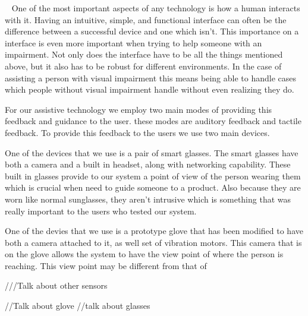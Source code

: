 ~\cite{iPhone}
One of the most important aspects of any technology is how a human interacts with it. Having an intuitive, simple, and functional interface can often be the difference between a successful device and one which isn't. This importance on a interface is even more important when trying to help someone with an impairment. Not only does the interface have to be all the things mentioned above, but it also has to be robust for different environments. In the case of assisting a person with visual impairment this means being able to handle cases which people without visual impairment handle without even realizing they do.

For our assistive technology we employ two main modes of providing this feedback and guidance to the user. these modes are auditory feedback and tactile feedback. To provide this feedback to the users we use two main devices.

One of the devices that we use is a pair of smart glasses. The smart glasses have both a camera and a built in headset, along with networking capability. These built in glasses provide to our system a point of view of the person wearing them which is crucial when need to guide someone to a product. Also because they are worn like normal sunglasses, they aren't intrusive which is something that was really important to the users who tested our system.


One of the devies that we use is a prototype glove that has been modified to have both a camera attached to it, as well set of vibration motors. This camera that is on the glove allows the system to have the view point of where the person is reaching. This view point may be different from that of 


///Talk about other sensors

//Talk about glove
//talk about glasses
